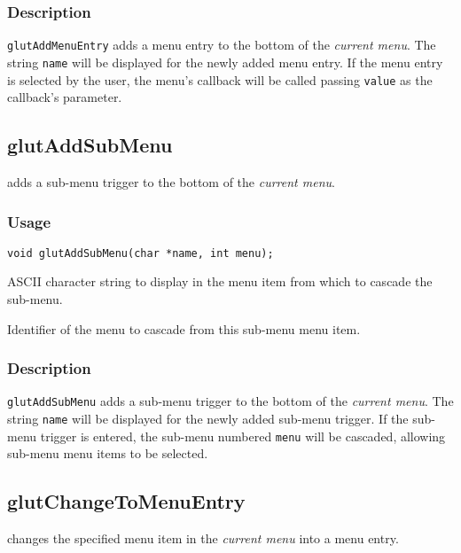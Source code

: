 \subsubsection*{Description}

{\tt glutAddMenuEntry} adds a menu entry to the bottom of the {\em current menu}.
The string {\tt name} will be displayed for the newly added menu entry.
If the menu entry is selected by the user, the menu's callback will be called
passing {\tt value} as the callback's parameter.

\subsection{glutAddSubMenu}

 adds a sub-menu trigger to the bottom of the {\em current menu}.

\subsubsection*{Usage}
\begin{verbatim}
void glutAddSubMenu(char *name, int menu);
\end{verbatim}
\begin{description}
\itemsep 0in
\item[\tt name]
ASCII character string to display in the menu item from which to cascade the sub-menu.
\item[\tt menu]
Identifier of the menu to cascade from this sub-menu menu item.
\end{description}

\subsubsection*{Description}

{\tt glutAddSubMenu} adds a sub-menu trigger to the bottom of the {\em current menu}.
The string {\tt name} will be displayed for the newly added sub-menu trigger.
If the sub-menu trigger is entered, the sub-menu numbered {\tt menu} will
be cascaded, allowing sub-menu menu items to be selected.

\subsection{glutChangeToMenuEntry}

 changes the specified menu item in the {\em current
menu} into a menu entry.

